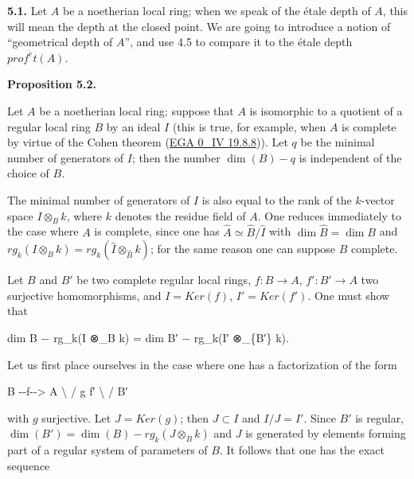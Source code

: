 \documentclass[
  11pt,
  a4paper,
]{book}
\newenvironment{Shaded}{}{}
\newcommand{\NormalTok}[1]{#1}
\begin{document}
\textbf{5.1.} Let \(A\) be a noetherian local ring; when we speak of the
étale depth of \(A\), this will mean the depth at the closed point. We
are going to introduce a notion of ``geometrical depth of \(A\)'', and
use 4.5 to compare it to the étale depth \(prof^{\acute{e}}t(A)\).

\textbf{Proposition 5.2.}

Let \(A\) be a noetherian local ring; suppose that \(A\) is isomorphic
to a quotient of a regular local ring \(B\) by an ideal \(I\) (this is
true, for example, when \(A\) is complete by virtue of the Cohen theorem
(\href{https://jcreinhold.github.io/ega/iv/06-ch0-19-formally-smooth-algebras.html\#198-cohen-algebras-and-p-cohen-rings-application-to-the-structure-of-complete-local-rings}{EGA
0\_IV 19.8.8})). Let \(q\) be the minimal number of generators of \(I\);
then the number \(\dim(B) - q\) is independent of the choice of \(B\).

The minimal number of generators of \(I\) is also equal to the rank of
the \(k\)-vector space \(I \otimes_{B} k\), where \(k\) denotes the
residue field of \(A\). One reduces immediately to the case where \(A\)
is complete, since one has \(\hat{A}
\simeq \hat{B}/\hat{I}\) with \(\dim \hat{B} = \dim B\) and
\(rg_{k}(I \otimes_{B} k) = rg_{k}(\hat{I} \otimes_{\hat{B}}
k)\); for the same reason one can suppose \(B\) complete.

Let \(B\) and \(B'\) be two complete regular local rings,
\(f : B \to A\), \(f' : B' \to A\) two surjective homomorphisms, and
\(I = Ker(f)\), \(I' = Ker(f')\). One must show that

\begin{Shaded}
\begin{Highlighting}[]
\NormalTok{dim B − rg\_k(I ⊗\_B k) = dim B′ − rg\_k(I′ ⊗\_\{B′\} k).}
\end{Highlighting}
\end{Shaded}

Let us first place ourselves in the case where one has a factorization
of the form

\begin{Shaded}
\begin{Highlighting}[]
\NormalTok{B {-}{-}f{-}{-}\textgreater{} A}
\NormalTok{ \textbackslash{}      /}
\NormalTok{  g    f′}
\NormalTok{   \textbackslash{}  /}
\NormalTok{    B′}
\end{Highlighting}
\end{Shaded}

with \(g\) surjective. Let \(J = Ker(g)\); then \(J \subset I\) and
\(I/J = I'\). Since \(B'\) is regular, \(\dim(B') = \dim(B) -
rg_{k}(J \otimes_{B} k)\) and \(J\) is generated by elements forming
part of a regular system of parameters of \(B\). It follows that one has
the exact sequence
\end{document}
